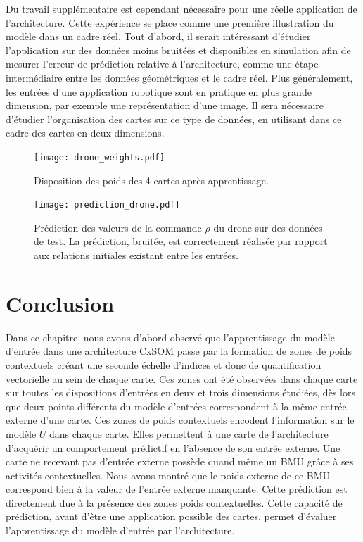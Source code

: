 \documentclass[../main]{subfiles}
\begin{document}
Du travail supplémentaire est cependant nécessaire pour une réelle application de l'architecture. Cette expérience se place comme une première illustration du modèle dans un cadre réel.
Tout d'abord, il serait intéressant d'étudier l'application sur des données moins bruitées et disponibles en simulation afin de mesurer l'erreur de prédiction relative à l'architecture, comme une étape intermédiaire entre les données géométriques et le cadre réel. 
Plus généralement, les entrées d'une application robotique sont en pratique en plus grande dimension, par exemple une représentation d'une image.
Il sera nécessaire d'étudier l'organisation des cartes sur ce type de données, en utilisant dans ce cadre des cartes en deux dimensions.

\begin{figure}
\texttt{[image: drone\_weights.pdf]}
\caption{Disposition des poids des 4 cartes après apprentissage.}
\label{fig:drone_w}
\end{figure}

\begin{figure}
	\texttt{[image: prediction\_drone.pdf]}
	\caption{Prédiction des valeurs de la commande $\rho$ du drone sur des données de test. La prédiction, bruitée, est correctement réalisée par rapport aux relations initiales existant entre les entrées.\label{fig:pred_drone}}
\end{figure}

\section{Conclusion}

Dans ce chapitre, nous avons d'abord observé que l'apprentissage du modèle d'entrée dans une architecture CxSOM passe par la formation de zones de poids contextuels créant une seconde échelle d'indices et donc de quantification vectorielle au sein de chaque carte. Ces zones ont été observées dans chaque carte sur toutes les dispositions d'entrées en deux et trois dimensions étudiées, dès lors que deux points différents du modèle d'entrées correspondent à la même entrée externe d'une carte.
Ces zones de poids contextuels encodent l'information sur le modèle $U$ dans chaque carte. Elles permettent à une carte de l'architecture d'acquérir un comportement prédictif en l'absence de son entrée externe. Une carte ne recevant pas d'entrée externe possède quand même un BMU grâce à ses activités contextuelles. Nous avons montré que le poids externe de ce BMU correspond bien à la valeur de l'entrée externe manquante. Cette prédiction est directement due à la présence des zones poids contextuelles.
Cette capacité de prédiction, avant d'être une application possible des cartes, permet d'évaluer l'apprentissage du modèle d'entrée par l'architecture.
\end{document}
